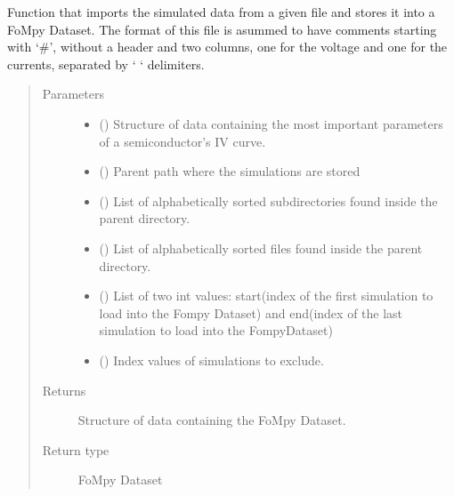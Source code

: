 \documentclass[letterpaper,10pt,english,openany, oneside]{sphinxmanual}
\begin{document}

\begin{fulllineitems}
\label{\detokenize{index:fompy.fds.file}}
Function that imports the simulated data from a given file and
stores it into a FoMpy Dataset. The format of this file is asummed to have comments
starting with ‘\#’, without a header and two columns, one for the voltage and one for the currents, separated
by ‘    ‘ delimiters.
\begin{quote}\begin{description}
\item[{Parameters}] \leavevmode\begin{itemize}
\item {} 
 () \textendash{} Structure of data containing the most important parameters of a semiconductor’s IV curve.

\item {} 
 () \textendash{} Parent path where the simulations are stored

\item {} 
 () \textendash{} List of alphabetically sorted subdirectories found inside the parent directory.

\item {} 
 () \textendash{} List of alphabetically sorted files found inside the parent directory.

\item {} 
 () \textendash{} List of two int values: start(index of the first simulation to load into the Fompy Dataset)
and end(index of the last simulation to load into the FompyDataset)

\item {} 
 () \textendash{} Index values of simulations to exclude.

\end{itemize}

\item[{Returns}] \leavevmode
{} \textendash{} Structure of data containing the FoMpy Dataset.

\item[{Return type}] \leavevmode
FoMpy Dataset

\end{description}\end{quote}

\end{fulllineitems}
\end{document}
